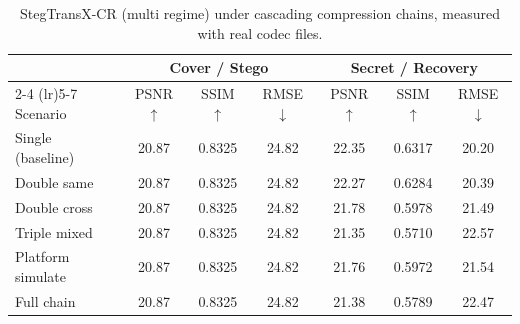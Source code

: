 \begin{table}[t]
\centering
\caption{StegTransX-CR (multi regime) under cascading compression chains, measured with real codec files.}
\label{tab:multi-cascade-real}
\begin{tabular}{lcccccc}
\toprule
& \multicolumn{3}{c}{Cover / Stego} & \multicolumn{3}{c}{Secret / Recovery} \\
\cmidrule(lr){2-4} \cmidrule(lr){5-7}
Scenario & PSNR $\uparrow$ & SSIM $\uparrow$ & RMSE $\downarrow$ & PSNR $\uparrow$ & SSIM $\uparrow$ & RMSE $\downarrow$ \\
\midrule
Single (baseline) & 20.87 & 0.8325 & 24.82 & 22.35 & 0.6317 & 20.20 \\
Double same & 20.87 & 0.8325 & 24.82 & 22.27 & 0.6284 & 20.39 \\
Double cross & 20.87 & 0.8325 & 24.82 & 21.78 & 0.5978 & 21.49 \\
Triple mixed & 20.87 & 0.8325 & 24.82 & 21.35 & 0.5710 & 22.57 \\
Platform simulate & 20.87 & 0.8325 & 24.82 & 21.76 & 0.5972 & 21.54 \\
Full chain & 20.87 & 0.8325 & 24.82 & 21.38 & 0.5789 & 22.47 \\
\bottomrule
\end{tabular}
\end{table}
